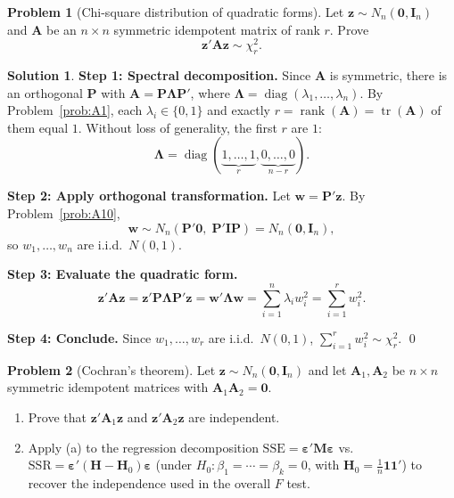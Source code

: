 \documentclass[12pt,a4paper]{article}
\theoremstyle{definition}
\newtheorem{exercise}{Problem}
\newtheorem*{solution*}{Solution}
\DeclareMathOperator\tr{tr}
\DeclareMathOperator\rank{rank}
\DeclareMathOperator\diag{diag}
\newcommand{\SSR}{\mathrm{SSR}}
\newcommand{\SSE}{\mathrm{SSE}}
\newcommand{\be}{\boldsymbol{\varepsilon}}
\newcommand{\bI}{\mathbf{I}}
\newcommand{\bH}{\mathbf{H}}
\newcommand{\bM}{\mathbf{M}}
\newcommand{\bone}{\mathbf{1}}
\newcommand{\bzero}{\mathbf{0}}
\newcommand{\bz}{\mathbf{z}}
\newcommand{\bA}{\mathbf{A}}
\newcommand{\bP}{\mathbf{P}}
\newcommand{\bw}{\mathbf{w}}
\begin{document}
\begin{exercise}[Chi-square distribution of quadratic forms]\label{prob:A12}
Let $\bz \sim N_n(\bzero, \bI_n)$ and $\bA$ be an $n\times n$ symmetric idempotent matrix of rank $r$. Prove
\[
\bz'\bA\bz \sim \chi^2_r.
\]
\end{exercise}

\begin{solution*}
\textbf{Step 1: Spectral decomposition.} Since $\bA$ is symmetric, there is an orthogonal $\bP$ with $\bA = \bP\boldsymbol\Lambda\bP'$, where $\boldsymbol\Lambda = \diag(\lambda_1,\ldots,\lambda_n)$. By Problem~\ref{prob:A1}, each $\lambda_i \in \{0,1\}$ and exactly $r = \rank(\bA) = \tr(\bA)$ of them equal $1$. Without loss of generality, the first $r$ are $1$:
\[
\boldsymbol\Lambda = \diag(\underbrace{1,\ldots,1}_{r},\underbrace{0,\ldots,0}_{n-r}).
\]

\textbf{Step 2: Apply orthogonal transformation.} Let $\bw = \bP'\bz$. By Problem~\ref{prob:A10},
\[
\bw \sim N_n(\bP'\bzero,\;\bP'\bI\bP) = N_n(\bzero, \bI_n),
\]
so $w_1,\ldots,w_n$ are i.i.d.\ $N(0,1)$.

\textbf{Step 3: Evaluate the quadratic form.}
\[
\bz'\bA\bz = \bz'\bP\boldsymbol\Lambda\bP'\bz = \bw'\boldsymbol\Lambda\bw = \sum_{i=1}^{n}\lambda_i w_i^2 = \sum_{i=1}^{r}w_i^2.
\]

\textbf{Step 4: Conclude.} Since $w_1,\ldots,w_r$ are i.i.d.\ $N(0,1)$, $\sum_{i=1}^{r}w_i^2 \sim \chi^2_r$. \qed
\end{solution*}

\begin{exercise}[Cochran's theorem]\label{prob:A13}
Let $\bz \sim N_n(\bzero, \bI_n)$ and let $\bA_1, \bA_2$ be $n\times n$ symmetric idempotent matrices with $\bA_1\bA_2 = \bzero$.
\begin{enumerate}[label=(\alph*),nosep]
\item Prove that $\bz'\bA_1\bz$ and $\bz'\bA_2\bz$ are independent.
\item Apply (a) to the regression decomposition $\SSE = \be'\bM\be$ vs.\ $\SSR = \be'(\bH-\bH_0)\be$ (under $H_0\colon \beta_1=\cdots=\beta_k=0$, with $\bH_0 = \frac{1}{n}\bone\bone'$) to recover the independence used in the overall $F$ test.
\end{enumerate}
\end{exercise}
\end{document}
